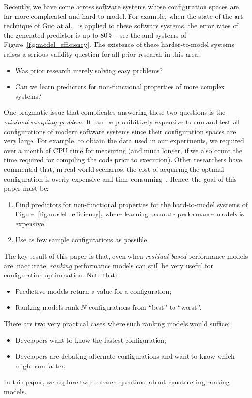 Recently, we have come across software systems whose configuration spaces
are far more complicated and hard to model. For example, when the state-of-the-art technique of Guo at al.~\cite{guo2013variability} is applied to these software systems, the error
rates of the generated predictor is up to 80\%---see the 
 and
 systems of Figure~\ref{fig:model_efficiency}. The existence
of these harder-to-model systems raises a serious validity question 
for all prior research in this area:
\begin{itemize}
\item Was prior research merely solving easy problems?
\item Can we learn predictors for non-functional properties of more complex systems?
\end{itemize}
One pragmatic issue that complicates answering these two questions is the {\em minimal sampling problem}. It can be prohibitively expensive to run and test all configurations
of modern software systems since their configuration spaces are very large. For example, to obtain the data used in our experiments, we required over a month of  CPU time for measuring
(and much longer, if we also count the time required for compiling the code prior to
execution). Other researchers have commented that, in real-world scenarios, the cost
of acquiring the optimal configuration is overly expensive and time-consuming~\cite{weiss2008maximizing}. Hence, the goal of this paper must be:
\begin{enumerate}
\item Find  predictors for non-functional properties for the hard-to-model systems of Figure~\ref{fig:model_efficiency}, where learning accurate performance models is expensive.
\item Use as few sample configurations as possible.
\end{enumerate}

 
The key result of this paper is that, even when {\em residual-based} performance models are
inaccurate, {\em ranking} performance models can still be very useful for configuration optimization. Note that:
\begin{itemize}
\item Predictive models return a value for a configuration;
\item Ranking models rank $N$ configurations from ``best'' to ``worst''.
\end{itemize}
There are two very practical cases where such ranking models would suffice:
\begin{itemize}
\item Developers want to know the fastest configuration;
\item Developers are debating alternate configurations and want to know
which might run faster.
\end{itemize}
In this paper, we explore two research questions about  constructing ranking models.

